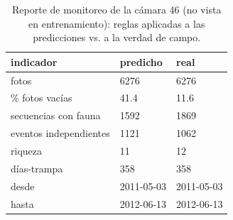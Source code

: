 \begin{table}[!htbp]
\centering
\small
\caption{Reporte de monitoreo de la cámara 46 (no vista en entrenamiento): reglas aplicadas a las predicciones vs. a la verdad de campo.}
\label{tab:monitorcam}
\begin{tabular}{lll}
\toprule
indicador & predicho & real \\
\midrule
fotos & 6276 & 6276 \\
\% fotos vacías & 41.4 & 11.6 \\
secuencias con fauna & 1592 & 1869 \\
eventos independientes & 1121 & 1062 \\
riqueza & 11 & 12 \\
días-trampa & 358 & 358 \\
desde & 2011-05-03 & 2011-05-03 \\
hasta & 2012-06-13 & 2012-06-13 \\
\bottomrule
\end{tabular}
\end{table}
